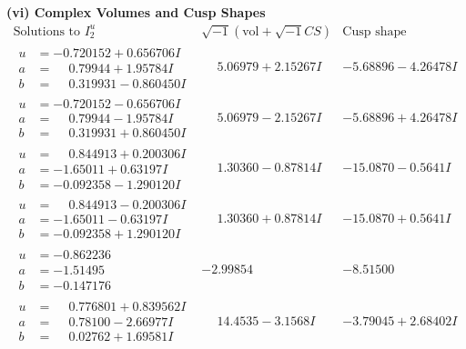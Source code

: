 \documentclass[1p]{elsarticle_modified}
\theoremstyle{definition}
\newcommand{\I}{\sqrt{-1}}
\begin{document}
\newpage\flushleft \textbf{(vi) Complex Volumes and Cusp Shapes}
$$\begin{array}{c|c|c}  
\text{Solutions to }I^u_{2}& \I (\text{vol} + \sqrt{-1}CS) & \text{Cusp shape}\\
 \hline 
\begin{aligned}
u &= -0.720152 + 0.656706 I \\
a &= \phantom{-}0.79944 + 1.95784 I \\
b &= \phantom{-}0.319931 - 0.860450 I\end{aligned}
 & \phantom{-}5.06979 + 2.15267 I & -5.68896 - 4.26478 I \\ \hline\begin{aligned}
u &= -0.720152 - 0.656706 I \\
a &= \phantom{-}0.79944 - 1.95784 I \\
b &= \phantom{-}0.319931 + 0.860450 I\end{aligned}
 & \phantom{-}5.06979 - 2.15267 I & -5.68896 + 4.26478 I \\ \hline\begin{aligned}
u &= \phantom{-}0.844913 + 0.200306 I \\
a &= -1.65011 + 0.63197 I \\
b &= -0.092358 - 1.290120 I\end{aligned}
 & \phantom{-}1.30360 - 0.87814 I & -15.0870 - 0.5641 I \\ \hline\begin{aligned}
u &= \phantom{-}0.844913 - 0.200306 I \\
a &= -1.65011 - 0.63197 I \\
b &= -0.092358 + 1.290120 I\end{aligned}
 & \phantom{-}1.30360 + 0.87814 I & -15.0870 + 0.5641 I \\ \hline\begin{aligned}
u &= -0.862236\phantom{ +0.000000I} \\
a &= -1.51495\phantom{ +0.000000I} \\
b &= -0.147176\phantom{ +0.000000I}\end{aligned}
 & -2.99854\phantom{ +0.000000I} & -8.51500\phantom{ +0.000000I} \\ \hline\begin{aligned}
u &= \phantom{-}0.776801 + 0.839562 I \\
a &= \phantom{-}0.78100 - 2.66977 I \\
b &= \phantom{-}0.02762 + 1.69581 I\end{aligned}
 & \phantom{-}14.4535 - 3.1568 I & -3.79045 + 2.68402 I \\ \hline\begin{aligned}

\end{aligned}
\end{array}$$
\end{document}
